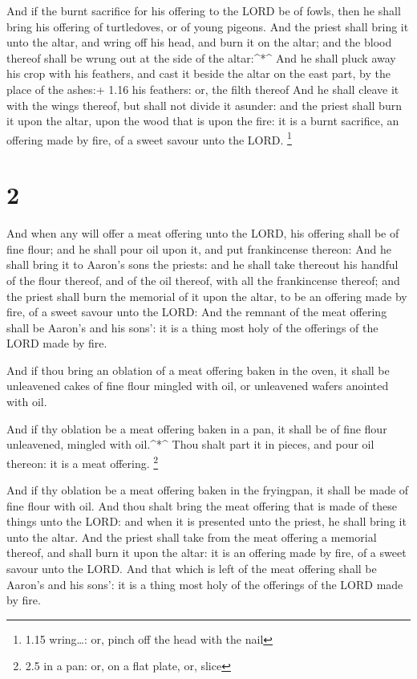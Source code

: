  And if the burnt sacrifice for his offering to the LORD be
of fowls, then he shall bring his offering of turtledoves, or of young
pigeons.  And the priest shall bring it unto the altar, and
wring off his head, and burn it on the altar; and the blood thereof
shall be wrung out at the side of the altar:\^{}*\^{}  And
he shall pluck away his crop with his feathers, and cast it beside the
altar on the east part, by the place of the ashes:+ 1.16 his feathers:
or, the filth thereof  And he shall cleave it with the
wings thereof, but shall not divide it asunder: and the priest shall
burn it upon the altar, upon the wood that is upon the fire: it is a
burnt sacrifice, an offering made by fire, of a sweet savour unto the
LORD. \footnote{1.15 wring\ldots: or, pinch off the head with the nail}

\hypertarget{section-1}{%
\section{2}\label{section-1}}

 And when any will offer a meat offering unto the LORD, his
offering shall be of fine flour; and he shall pour oil upon it, and put
frankincense thereon:  And he shall bring it to Aaron's sons
the priests: and he shall take thereout his handful of the flour
thereof, and of the oil thereof, with all the frankincense thereof; and
the priest shall burn the memorial of it upon the altar, to be an
offering made by fire, of a sweet savour unto the LORD:  And
the remnant of the meat offering shall be Aaron's and his sons': it is a
thing most holy of the offerings of the LORD made by fire.

 And if thou bring an oblation of a meat offering baken in
the oven, it shall be unleavened cakes of fine flour mingled with oil,
or unleavened wafers anointed with oil.

 And if thy oblation be a meat offering baken in a pan, it
shall be of fine flour unleavened, mingled with oil.\^{}*\^{}
 Thou shalt part it in pieces, and pour oil thereon: it is a
meat offering. \footnote{2.5 in a pan: or, on a flat plate, or, slice}

 And if thy oblation be a meat offering baken in the
fryingpan, it shall be made of fine flour with oil.  And
thou shalt bring the meat offering that is made of these things unto the
LORD: and when it is presented unto the priest, he shall bring it unto
the altar.  And the priest shall take from the meat offering
a memorial thereof, and shall burn it upon the altar: it is an offering
made by fire, of a sweet savour unto the LORD.  And that
which is left of the meat offering shall be Aaron's and his sons': it is
a thing most holy of the offerings of the LORD made by fire.

